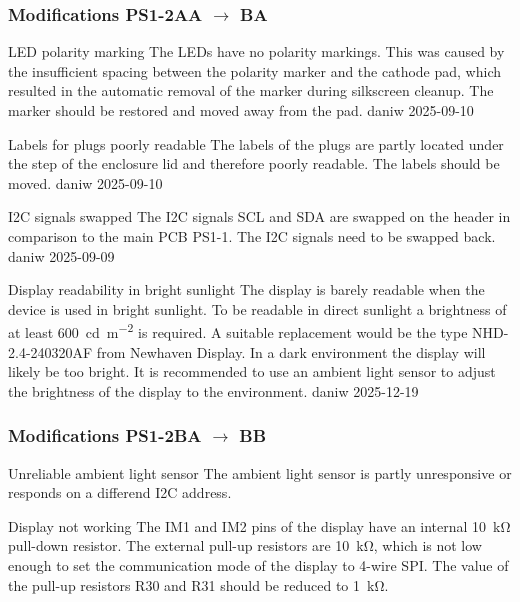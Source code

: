 \FloatBarrier

\subsubsection{Modifications PS1-2AA $\to$ BA}

\begin{ModTable}

\ModItemDone
{LED polarity marking}
{The LEDs have no polarity markings. This was caused by the insufficient spacing between the polarity marker and the cathode pad, which resulted in the automatic removal of the marker during silkscreen cleanup. }
{The marker should be restored and moved away from the pad. }
{daniw}
{2025-09-10}

\ModItemDone
{Labels for plugs poorly readable}
{The labels of the plugs are partly located under the step of the enclosure lid and therefore poorly readable. }
{The labels should be moved. }
{daniw}
{2025-09-10}

\ModItemDone
{\acs{I2C} signals swapped}
{The \ac{I2C} signals SCL and SDA are swapped on the header in comparison to the main PCB PS1-1. }
{The \ac{I2C} signals need to be swapped back. }
{daniw}
{2025-09-09}

\ModItemDone
{Display readability in bright sunlight}
{The display is barely readable when the device is used in bright sunlight. }
{To be readable in direct sunlight a brightness of at least \qty{600}{\candela\per\square\meter} is required. A suitable replacement would be the type NHD-2.4-240320AF from Newhaven Display. In a dark environment the display will likely be too bright. It is recommended to use an ambient light sensor to adjust the brightness of the display to the environment. }
{daniw}
{2025-12-19}

\end{ModTable}

\FloatBarrier

\subsubsection{Modifications PS1-2BA $\to$ BB}

\begin{ModTable}

\ModItemOpen
{Unreliable ambient light sensor}
{The ambient light sensor is partly unresponsive or responds on a differend \ac{I2C} address. }
{}
{}
{}

\ModItemOpen
{Display not working}
{The IM1 and IM2 pins of the display have an internal \qty{10}{\kilo\ohm} pull-down resistor. The external pull-up resistors are \qty{10}{\kilo\ohm}, which is not low enough to set the communication mode of the display to 4-wire \ac{SPI}. }
{The value of the pull-up resistors R30 and R31 should be reduced to \qty{1}{\kilo\ohm}. }
{}
{}

\end{ModTable}

